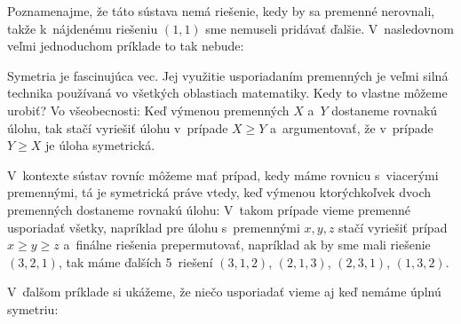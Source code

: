 Poznamenajme, že táto sústava nemá riešenie, kedy by sa premenné nerovnali, takže k~nájdenému riešeniu $(1,1)$ sme nemuseli pridávať ďalšie. V~nasledovnom veľmi jednoduchom príklade to tak nebude:


Symetria je fascinujúca vec. Jej využitie usporiadaním premenných je veľmi silná technika používaná vo všetkých oblastiach matematiky. Kedy to vlastne môžeme urobiť? Vo všeobecnosti: Keď výmenou premenných $X$ a~$Y$ dostaneme rovnakú úlohu, tak stačí vyriešiť úlohu v~prípade $X \ge Y$ a~argumentovať, že v~prípade $Y \ge X$ je úloha symetrická. 

V~kontexte sústav rovníc môžeme mať prípad, kedy máme rovnicu s~viacerými premennými, tá je symetrická práve vtedy, keď výmenou ktorýchkoľvek dvoch premenných dostaneme rovnakú úlohu: V~takom prípade vieme premenné usporiadať všetky, napríklad pre úlohu s~premennými $x,y,z$ stačí vyriešiť prípad $x \ge y \ge z$ a~finálne riešenia prepermutovať, napríklad ak by sme mali riešenie $(3,2,1)$, tak máme ďalších 5~riešení $(3,1,2)$, $(2,1,3)$, $(2,3,1)$, $(1,3,2)$.

V~ďalšom príklade si ukážeme, že niečo usporiadať vieme aj keď nemáme úplnú symetriu:

